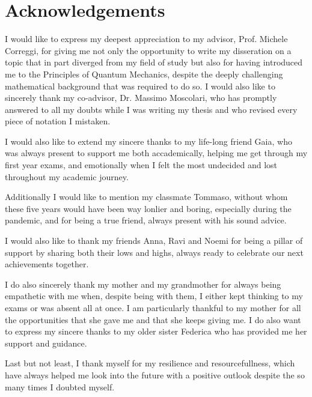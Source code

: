 \documentclass{Configuration_Files/PoliMi3i_thesis}
\begin{document}
\listoffigures



\chapter*{Acknowledgements}
I would like to express my deepest appreciation to my advisor, Prof. 
Michele Correggi, for giving me not only the opportunity to write my disseration 
on a topic that in part diverged from my field of study but also for having
introduced me to the Principles of Quantum Mechanics, despite the deeply
challenging mathematical background that was required to do so. 
I would also like to sincerely thank my co-advisor, Dr. Massimo Moscolari, who
has promptly answered to all my doubts while I was writing my thesis and who
revised every piece of notation I mistaken.

I would also like to extend my sincere thanks to my life-long friend Gaia, who was 
always present to support me both accademically, helping me get through my 
first year exams, and emotionally when I felt the most
undecided and lost throughout my academic journey. 

Additionally I would like to mention my classmate Tommaso, without whom these five 
years would have been way lonlier and boring, especially during the pandemic,
and for being a true friend, always present with his sound advice. 

I would also like to thank my friends Anna, Ravi and Noemi for being a pillar
of support by sharing both their lows and highs, always ready to celebrate our next 
achievements together. 

I do also sincerely thank my mother and my grandmother for always being empathetic with me when, despite being with them, I either kept thinking to my exams or was absent all at once. I am
particularly thankful to my mother for all the opportunities that she gave me and that she keeps
giving me. I do also want to express my sincere thanks to my older sister Federica who has provided me her support and guidance.

Last but not least, I thank myself for my resilience and resourcefullness, which have always helped me look into the future with a positive outlook despite the so many times I doubted myself.

\cleardoublepage
\end{document}
